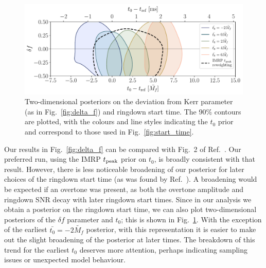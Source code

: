 \begin{figure}[t]
    \centering
    \includegraphics[width=0.9\columnwidth]{Figures/SearchingforaRingdownOvertoneinGW150914/kerr_deviation_2d.pdf}
    \caption[Posteriors on the deviation from Kerr for the real part of the GW150914 overtone frequency and ringdown start time for each choice of the ringdown start-time prior]{ 
    Two-dimensional posteriors on the deviation from Kerr parameter (as in Fig.~\ref{fig:delta_f}) and ringdown start time.
    The 90\% contours are plotted, with the colours and line styles indicating the $t_0$ prior and correspond to those used in Fig.~\ref{fig:start_time}.
    }
    \label{fig:delta_f_2d}
\end{figure}

Our results in Fig.~\ref{fig:delta_f} can be compared with Fig.~2 of Ref.~\cite{Isi:2022mhy}. 
Our preferred run, using the IMRP $t_{\rm peak}$ prior on $t_0$, is broadly consistent with that result.
However, there is less noticeable broadening of our posterior for later choices of the ringdown start time (as was found by Ref.~\cite{Isi:2022mhy}). 
A broadening would be expected if an overtone was present, as both the overtone amplitude and ringdown SNR decay with later ringdown start times.
Since in our analysis we obtain a posterior on the ringdown start time, we can also plot two-dimensional posteriors of the $\delta f$ parameter and $t_0$; this is shown in Fig.~\ref{fig:delta_f_2d}.
With the exception of the earliest $\bar{t_0} = -2\tilde{M_f}$ posterior, with this representation it is easier to make out the slight broadening of the posterior at later times. 
The breakdown of this trend for the earliest $t_0$ deserves more attention, perhaps indicating sampling issues or unexpected model behaviour.

